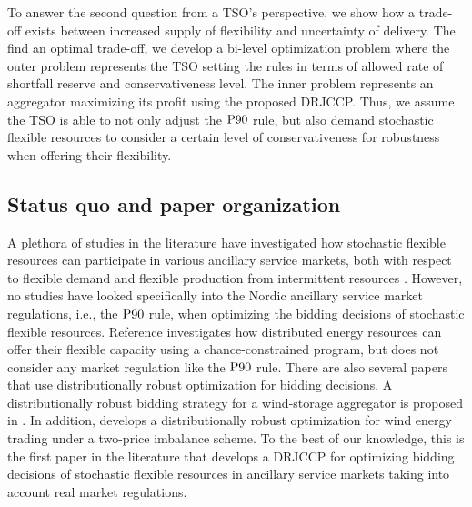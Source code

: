 \documentclass[conference]{IEEEtran}
\begin{document}
To answer the second question from a TSO's perspective, we show how a trade-off exists between increased supply of flexibility  and uncertainty of delivery. The find an optimal trade-off, we develop a bi-level optimization problem where the outer problem represents the \ac{TSO} setting the rules in terms of allowed rate of shortfall reserve and conservativeness level. The inner problem represents an aggregator maximizing its profit using the proposed \ac{DRJCCP}. Thus, we assume the \ac{TSO} is able to not only adjust the $\rm{P90}$ rule, but also demand stochastic flexible resources to consider a  certain level of conservativeness for robustness when offering their flexibility.


\vspace{2mm}
\subsection{Status quo and paper organization}
\vspace{-1mm}
A plethora of studies in the literature have investigated how stochastic flexible resources can participate in various ancillary service markets, both with respect to flexible demand  \cite{bondy2016procedure, bondy2014performance, biegel2014integration, AchievingControllabilityofElectricLoads} and flexible production from intermittent resources \cite{hansen2016provision, ullah2009wind, morey2023comprehensive, alshehri2019modelling}. However, no studies have looked specifically into the Nordic ancillary service market regulations, i.e., the $\rm{P90}$ rule, when optimizing the bidding decisions of stochastic flexible resources. Reference \cite{zhang2018data} investigates how distributed energy resources can offer their flexible capacity using a chance-constrained program, but does not consider any market regulation like the $\rm{P90}$ rule. There are also several papers that use distributionally robust optimization for bidding decisions. A distributionally robust bidding strategy for a wind-storage aggregator is proposed in \cite{Hug}. In addition, \cite{pierre} develops a distributionally robust optimization for wind energy trading under a two-price imbalance scheme. To the best of our knowledge, this is the first paper in the literature that develops a \ac{DRJCCP} for optimizing bidding decisions of stochastic flexible resources in ancillary service markets taking into account real market regulations. 
\end{document}
